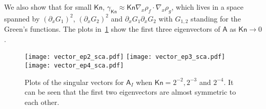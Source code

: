 \documentclass[english,reqno]{amsart}
\theoremstyle{plain}
\theoremstyle{definition} %
\newcommand{\Amat}{\mathsf{A}}
\newcommand{\rd}{\mathrm{d}}
\newcommand{\Kn}{\mathsf{Kn}}
\newcommand{\ql}[1]{\textcolor{blue}{\textbf{QL: #1}}}
\begin{document}
We also show that for small $\Kn$, $\gamma_\Kn \approx \Kn \nabla_x\rho_f\cdot\nabla_x\rho_g$, which lives in a space spanned by $(\partial_x G_1)^2$, $(\partial_x G_2)^2$ and $\partial_xG_1\partial_xG_2$ with $G_{1,2}$ standing for the Green's functions. The plots in~\ref{fig:vectors_int_sca} show the first three eigenvectors of $\Amat$ as $\Kn\to0$.
\begin{figure}[htp]
\centering
  \texttt{[image: vector\_ep2\_sca.pdf]}
  \texttt{[image: vector\_ep3\_sca.pdf]}
  \texttt{[image: vector\_ep4\_sca.pdf]}
  \caption{Plots of the singular vectors for $\Amat_I$ when $\Kn=2^{-2},2^{-3}$ and $2^{-4}$. It can be seen that the first two eigenvectors are almost symmetric to each other.}
  \label{fig:vectors_int_sca}
\end{figure}

%
%






\end{document}
